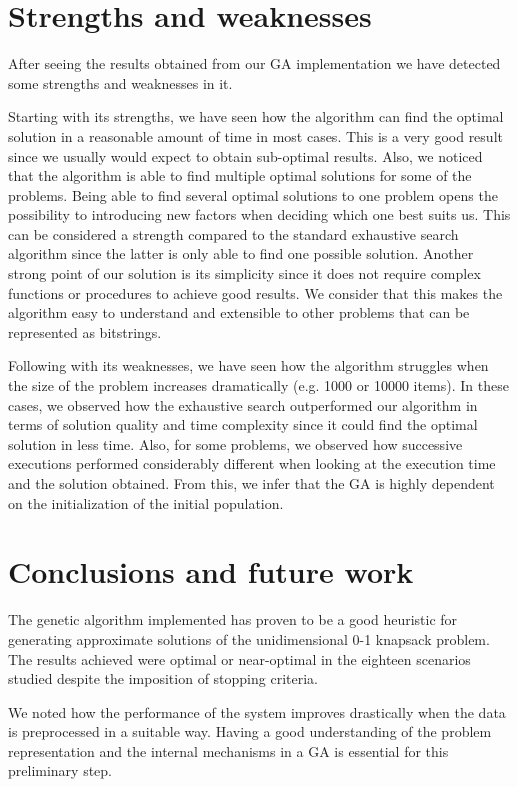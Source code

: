 \documentclass[anon]{CI}
\begin{document}
\section{Strengths and weaknesses} \label{sec:strengths}

After seeing the results obtained from our GA implementation we have detected some strengths and weaknesses in it.

Starting with its strengths, we have seen how the algorithm can find the optimal solution in a reasonable amount of time in most cases. This is a very good result since we usually would expect to obtain sub-optimal results. Also, we noticed that the algorithm is able to find multiple optimal solutions for some of the problems. Being able to find several optimal solutions to one problem opens the possibility to introducing new factors when deciding which one best suits us. This can be considered a strength compared to the standard exhaustive search algorithm since the latter is only able to find one possible solution. Another strong point of our solution is its simplicity since it does not require complex functions or procedures to achieve good results. We consider that this makes the algorithm easy to understand and extensible to other problems that can be represented as bitstrings.

Following with its weaknesses, we have seen how the algorithm struggles when the size of the problem increases dramatically (e.g. 1000 or 10000 items). In these cases, we observed how the exhaustive search outperformed our algorithm in terms of solution quality and time complexity since it could find the optimal solution in less time. Also, for some problems, we observed how successive executions performed considerably different when looking at the execution time and the solution obtained. From this, we infer that the GA is highly dependent on the initialization of the initial population.

\section{Conclusions and future work}

The genetic algorithm implemented has proven to be a good heuristic for generating approximate solutions of the unidimensional 0-1 knapsack problem. The results achieved were optimal or near-optimal in the eighteen scenarios studied despite the imposition of stopping criteria. 

We noted how the performance of the system improves drastically when the data is preprocessed in a suitable way. Having a good understanding of the problem representation and the internal mechanisms in a GA is essential for this preliminary step.
\end{document}
